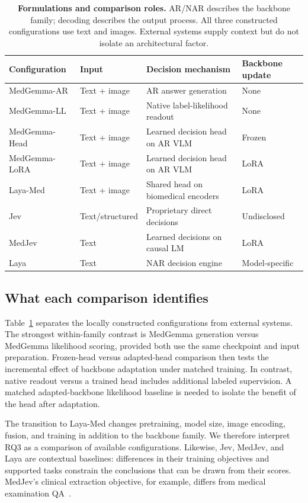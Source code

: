 \begin{table}[t]
\centering\small
\setlength{\tabcolsep}{4pt}\renewcommand{\arraystretch}{1.15}
\caption{\textbf{Formulations and comparison roles.} AR/NAR describes the backbone family; decoding describes the output process. All three constructed configurations use text and images. External systems supply context but do not isolate an architectural factor.}
\label{tab:taxonomy}
\begin{tabularx}{\linewidth}{@{}l l X l@{}}
\toprule
\textbf{Configuration} & \textbf{Input} & \textbf{Decision mechanism} & \textbf{Backbone update}\\
\midrule
MedGemma-AR & Text + image & AR answer generation & None\\
MedGemma-LL & Text + image & Native label-likelihood readout & None\\
MedGemma-Head & Text + image & Learned decision head on AR VLM & Frozen\\
MedGemma-LoRA & Text + image & Learned decision head on AR VLM & LoRA\\
Laya-Med & Text + image & Shared head on biomedical encoders & LoRA\\
\midrule
Jev & Text/structured & Proprietary direct decisions & Undisclosed\\
MedJev & Text & Learned decisions on causal LM & LoRA\\
Laya & Text & NAR decision engine & Model-specific\\
\bottomrule
\end{tabularx}
\end{table}


\subsection{What each comparison identifies}

Table~\ref{tab:taxonomy} separates the locally constructed configurations from external systems. The strongest within-family contrast is MedGemma generation versus MedGemma likelihood scoring, provided both use the same checkpoint and input preparation. Frozen-head versus adapted-head comparison then tests the incremental effect of backbone adaptation under matched training. In contrast, native readout versus a trained head includes additional labeled supervision. A matched adapted-backbone likelihood baseline is needed to isolate the benefit of the head after adaptation.

The transition to Laya-Med changes pretraining, model size, image encoding, fusion, and training in addition to the backbone family. We therefore interpret RQ3 as a comparison of available configurations. Likewise, Jev, MedJev, and Laya are contextual baselines: differences in their training objectives and supported tasks constrain the conclusions that can be drawn from their scores. MedJev's clinical extraction objective, for example, differs from medical examination QA~\cite{medjev}.

